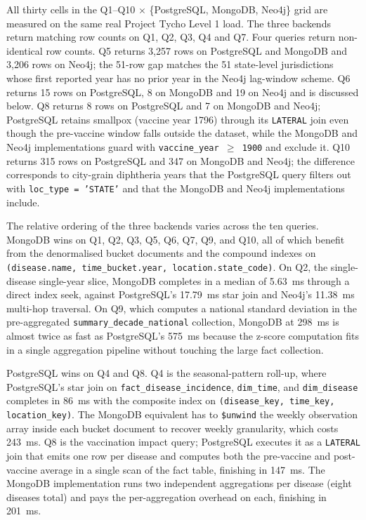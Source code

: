 \documentclass[12pt,a4paper]{article}
\begin{document}
\begin{table}[H]
{\begin{tabular}{clrrr}
\bottomrule
\end{tabular}%
}
\vspace{0.3em}
\raggedright\small All thirty cells in the Q1--Q10 $\times$ \{PostgreSQL, MongoDB, Neo4j\} grid are measured on the same real Project Tycho Level 1 load. The three backends return matching row counts on Q1, Q2, Q3, Q4 and Q7. Four queries return non-identical row counts. Q5 returns 3{,}257 rows on PostgreSQL and MongoDB and 3{,}206 rows on Neo4j; the 51-row gap matches the 51 state-level jurisdictions whose first reported year has no prior year in the Neo4j lag-window scheme. Q6 returns 15 rows on PostgreSQL, 8 on MongoDB and 19 on Neo4j and is discussed below. Q8 returns 8 rows on PostgreSQL and 7 on MongoDB and Neo4j; PostgreSQL retains smallpox (vaccine year 1796) through its \texttt{LATERAL} join even though the pre-vaccine window falls outside the dataset, while the MongoDB and Neo4j implementations guard with \texttt{vaccine\_year $\geq$ 1900} and exclude it. Q10 returns 315 rows on PostgreSQL and 347 on MongoDB and Neo4j; the difference corresponds to city-grain diphtheria years that the PostgreSQL query filters out with \texttt{loc\_type = 'STATE'} and that the MongoDB and Neo4j implementations include.
\end{table}

The relative ordering of the three backends varies across the ten queries. MongoDB wins on Q1, Q2, Q3, Q5, Q6, Q7, Q9, and Q10, all of which benefit from the denormalised bucket documents and the compound indexes on \texttt{(disease.name, time\_bucket.year, location.state\_code)}. On Q2, the single-disease single-year slice, MongoDB completes in a median of 5.63~ms through a direct index seek, against PostgreSQL's 17.79~ms star join and Neo4j's 11.38~ms multi-hop traversal. On Q9, which computes a national standard deviation in the pre-aggregated \texttt{summary\_decade\_national} collection, MongoDB at 298~ms is almost twice as fast as PostgreSQL's 575~ms because the z-score computation fits in a single aggregation pipeline without touching the large fact collection.

PostgreSQL wins on Q4 and Q8. Q4 is the seasonal-pattern roll-up, where PostgreSQL's star join on \texttt{fact\_disease\_incidence}, \texttt{dim\_time}, and \texttt{dim\_disease} completes in 86~ms with the composite index on \texttt{(disease\_key, time\_key, location\_key)}. The MongoDB equivalent has to \texttt{\$unwind} the weekly observation array inside each bucket document to recover weekly granularity, which costs 243~ms. Q8 is the vaccination impact query; PostgreSQL executes it as a \texttt{LATERAL} join that emits one row per disease and computes both the pre-vaccine and post-vaccine average in a single scan of the fact table, finishing in 147~ms. The MongoDB implementation runs two independent aggregations per disease (eight diseases total) and pays the per-aggregation overhead on each, finishing in 201~ms.
\end{document}
